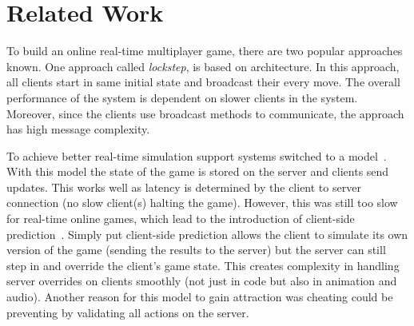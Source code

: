 
\section{Related Work}

To build an online real-time multiplayer game, there are two popular approaches known. One approach called \ptoP \emph{lockstep}, is based on \ptoP architecture. In this approach, all clients start in same initial state and broadcast their every move. The overall performance of the system is dependent on slower clients in the system. Moreover, since the clients use broadcast methods to communicate, the approach has high message complexity.

To achieve better real-time simulation support systems switched to a \clientServer model~\cite{DOOMfaq}. With this model the state of the game is stored on the server and clients send updates. This works well as latency is determined by the client to server connection (no slow client(s) halting the game). However, this was still too slow for real-time online games, which lead to the introduction of client-side prediction~\cite{bernier2001latency}. Simply put client-side prediction allows the client to simulate its own version of the game (sending the results to the server) but the server can still step in and override the client's game state. This creates complexity in handling server overrides on clients smoothly (not just in code but also in animation and audio). Another reason for this model to gain attraction was cheating could be preventing by validating all actions on the server.

